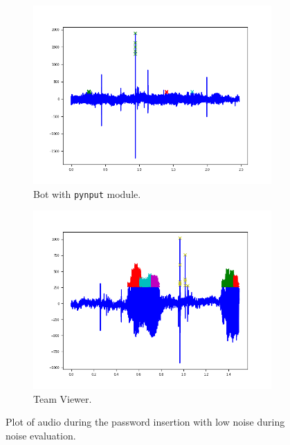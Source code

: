 \begin{figure}[H]
     \centering
	 \begin{subfigure}[b]{0.48\textwidth}
         \centering
         \includegraphics[width=\linewidth]{Images/Results/Bot/noise}
         \caption{\footnotesize{Bot with \texttt{pynput} module.}}
     \end{subfigure}
	 \hfill     
     \begin{subfigure}[b]{0.48\textwidth}
         \centering
         \includegraphics[width=\linewidth]{Images/Results/TeamViewer/noise}
         \caption{\footnotesize{Team Viewer.}}
     \end{subfigure}
     \caption{\footnotesize{Plot of audio during the password insertion with low noise during noise evaluation.}}\label{Results:noise_img}
\end{figure}
